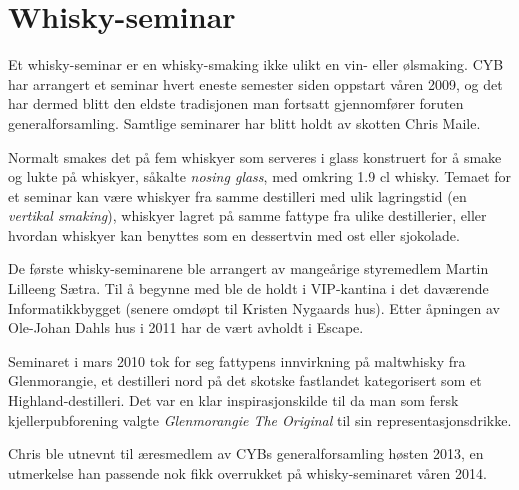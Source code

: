 \chapter{Whisky-seminar}

\author{Skrevet av Torgeir Lebesbye}

Et whisky-seminar er en whisky-smaking ikke ulikt en vin- eller ølsmaking. CYB har arrangert et seminar hvert eneste semester siden oppstart våren 2009, og det har dermed blitt den eldste tradisjonen man fortsatt gjennomfører foruten generalforsamling. Samtlige seminarer har blitt holdt av skotten Chris Maile.

Normalt smakes det på fem whiskyer som serveres i glass konstruert for å smake og lukte på whiskyer, såkalte \textit{nosing glass}, med omkring 1.9 cl whisky. Temaet for et seminar kan være whiskyer fra samme destilleri med ulik lagringstid (en \textit{vertikal smaking}), whiskyer lagret på samme fattype fra ulike destillerier, eller hvordan whiskyer kan benyttes som en dessertvin med ost eller sjokolade.

De første whisky-seminarene ble arrangert av mangeårige styremedlem Martin Lilleeng Sætra. Til å begynne med ble de holdt i VIP-kantina i det daværende Informatikkbygget (senere omdøpt til Kristen Nygaards hus). Etter åpningen av Ole-Johan Dahls hus i 2011 har de vært avholdt i Escape.

Seminaret i mars 2010 tok for seg fattypens innvirkning på maltwhisky fra Glenmorangie, et destilleri nord på det skotske fastlandet kategorisert som et Highland-destilleri. Det var en klar inspirasjonskilde til da man som fersk kjellerpubforening valgte \textit{Glenmorangie The Original} til sin representasjonsdrikke.

Chris ble utnevnt til æresmedlem av CYBs generalforsamling høsten 2013, en utmerkelse han passende nok fikk overrukket på whisky-seminaret våren 2014.